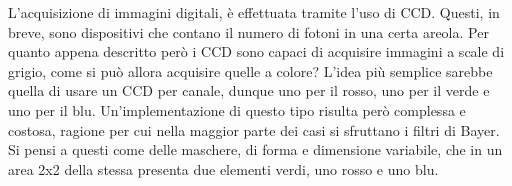 \documentclass{subfiles}
\begin{document}
L'acquisizione di immagini digitali, è effettuata tramite l'uso di CCD.
Questi, in breve, sono dispositivi che contano il numero di fotoni in una certa areola.
Per quanto appena descritto però i CCD sono capaci di acquisire immagini a scale di grigio, come si può allora acquisire quelle a colore?
L'idea più semplice sarebbe quella di usare un CCD per canale, dunque uno per il rosso, uno per il verde e uno per il blu.
Un'implementazione di questo tipo risulta però complessa e costosa, ragione per cui nella maggior parte dei casi si sfruttano i filtri di Bayer.
Si pensi a questi come delle maschere, di forma e dimensione variabile, che in un area 2x2 della stessa presenta due elementi verdi, uno rosso e uno blu\footnotemark[1].

\end{document}
